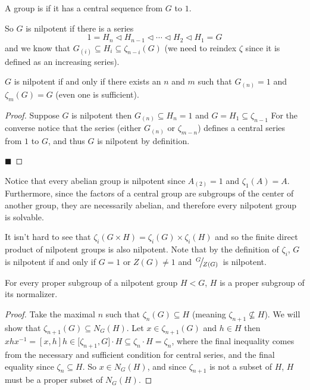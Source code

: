 \documentclass[10pt]{article}
\def\slfrac#1#2{\left.{}^{#1}\mkern-4mu\middle/\mkern-3mu{}_{#2}\right.}
\def\normal{\mathrel\triangleleft}
\begin{document}
\begin{defn*}

    A group is  if it has a central sequence from $G$ to $1$.

\end{defn*}

So $G$ is nilpotent if there is a series
\[ 1 = H_n \normal H_{n-1} \normal \cdots \normal H_2 \normal H_1 = G \]
and we know that $G_{(i)}\subseteq H_i\subseteq\zeta_{n-i}(G)$ (we need to reindex $\zeta$ since it is defined as an increasing series).

\begin{prop*}

    $G$ is nilpotent if and only if there exists an $n$ and $m$ such that $G_{(n)}=1$ and $\zeta_m(G)=G$ (even one is sufficient).

\end{prop*}

\begin{proof}

    Suppose $G$ is nilpotent then $G_{(n)}\subseteq H_n=1$ and $G=H_1\subseteq\zeta_{n-1}$
    For the converse notice that the series (either $G_{(n)}$ or $\zeta_{m-n}$) defines a central series from $1$ to $G$, and thus $G$ is nilpotent by definition.

    \hfill$\blacksquare$

\end{proof}

Notice that every abelian group is nilpotent since $A_{(2)}=1$ and $\zeta_1(A)=A$.
Furthermore, since the factors of a central group are subgroups of the center of another group, they are necessarily abelian, and therefore every nilpotent group is solvable.

It isn't hard to see that $\zeta_i(G\times H)=\zeta_i(G)\times\zeta_i(H)$ and so the finite direct product of nilpotent groups is also nilpotent.
Note that by the definition of $\zeta_i$, $G$ is nilpotent if and only if $G=1$ or $Z(G)\neq1$ and $\slfrac G{Z(G)}$ is nilpotent.

\begin{lemm*}

    For every proper subgroup of a nilpotent group $H<G$, $H$ is a proper subgroup of its normalizer.

\end{lemm*}

\begin{proof}

    Take the maximal $n$ such that $\zeta_n(G)\subseteq H$ (meaning $\zeta_{n+1}\not\subseteq H$).
    We will show that $\zeta_{n+1}(G)\subseteq N_G(H)$.
    Let $x\in\zeta_{n+1}(G)$ and $h\in H$ then $xhx^{-1}=[x,h]h\in\bigl[\zeta_{n+1},G\bigr]\cdot H\subseteq\zeta_n\cdot H=\zeta_n$, where the final inequality comes from the necessary and sufficient
    condition for central series, and the final equality since $\zeta_n\subseteq H$.
    So $x\in N_G(H)$, and since $\zeta_{n+1}$ is not a subset of $H$, $H$ must be a proper subset of $N_G(H)$.

\end{proof}
\end{document}
